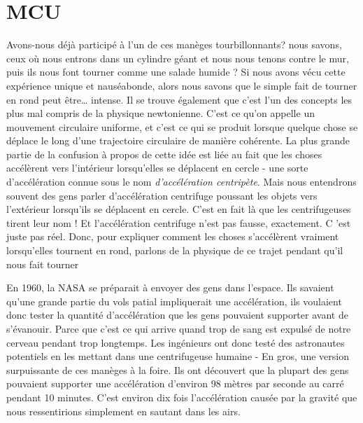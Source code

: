 \documentclass[a4paper, twoside]{article}
\begin{document}
\newpage

\hypertarget{mcu}{%
\section{MCU}\label{mcu}}

Avons-nous déjà participé à l'un de ces manèges tourbillonnants? nous
savons, ceux où nous entrons dans un cylindre géant et nous nous tenons
contre le mur, puis ils nous font tourner comme une salade humide ? Si
nous avons vécu cette expérience unique et nauséabonde, alors nous
savons que le simple fait de tourner en rond peut être\ldots{} intense.
Il se trouve également que c'est l'un des concepts les plus mal compris
de la physique newtonienne. C'est ce qu'on appelle un mouvement
circulaire uniforme, et c'est ce qui se produit lorsque quelque chose se
déplace le long d'une trajectoire circulaire de manière cohérente. La
plus grande partie de la confusion à propos de cette idée est liée au
fait que les choses accélèrent vers l'intérieur lorsqu'elles se
déplacent en cercle - une sorte d'accélération connue sous le nom
\emph{d'accélération centripète}. Mais nous entendrons souvent des gens
parler d'accélération centrifuge poussant les objets vers l'extérieur
lorsqu'ils se déplacent en cercle. C'est en fait là que les
centrifugeuses tirent leur nom ! Et l'accélération centrifuge n'est pas
fausse, exactement. C 'est juste pas réel. Donc, pour expliquer comment
les choses s'accélèrent vraiment lorsqu'elles tournent en rond, parlons
de la physique de ce trajet pendant qu'il nous fait tourner

En 1960, la NASA se préparait à envoyer des gens dans l'espace. Ils
savaient qu'une grande partie du vols patial impliquerait une
accélération, ils voulaient donc tester la quantité d'accélération que
les gens pouvaient supporter avant de s'évanouir. Parce que c'est ce qui
arrive quand trop de sang est expulsé de notre cerveau pendant trop
longtemps. Les ingénieurs ont donc testé des astronautes potentiels en
les mettant dans une centrifugeuse humaine - En gros, une version
surpuissante de ces manèges à la foire. Ils ont découvert que la plupart
des gens pouvaient supporter une accélération d'environ 98 mètres par
seconde au carré pendant 10 minutes. C'est environ dix fois
l'accélération causée par la gravité que nous ressentirions simplement
en sautant dans les airs.
\end{document}
